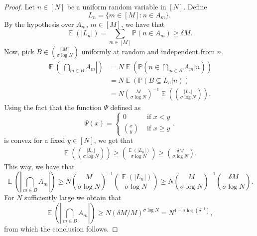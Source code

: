 \documentclass[letter, 11pt]{article}
\theoremstyle{plain} %
\theoremstyle{definition} %
\theoremstyle{plain}
\theoremstyle{plain}
\newcommand{\bP}{\mathbb{P}}
\newcommand{\1}{\mathbbm{1}}
\newcommand{\E}{\operatorname{\mathbb{E}}}
\begin{document}
\begin{proof}
    Let $n\in [N]$ be a uniform random variable in $[N]$. Define 
    $$L_n=\{m\in [M] : n\in A_m\}. $$
    By the hypothesis over $A_m$, $m\in [M]$, we have that
    $$\E(|L_n|) = \sum_{m\in [M]} \bP(n\in A_m)\geq \delta M.   $$
    Now, pick $B\in \binom{[M]}{\sigma \log{N}}$ uniformly at random and independent from $n$. 
    \begin{align*}
        \E\left( \left| \bigcap_{m\in B} A_m \right| \right) &= N \E\left(\bP\left(  n\in \bigcap_{m\in B} A_m \Bigg| n\right) \right)\\
        &= N \E\left(\bP\left( B\subseteq L_n  \Bigg| n\right) \right)\\
        &= N \binom{M}{\sigma \log{N}}^{-1} \E\left(  \binom{|L_n|}{\sigma \log{N}} \right) .
    \end{align*}
    Using the fact that the function $\Psi$ defined as
    $$
    \Psi(x) =\begin{cases}
        0 & \text{ if } x<y\\
        \binom{x}{y} & \text{ if }x\geq y
    \end{cases} .
    $$
    is convex for a fixed $y\in [N]$, we get that 
    \begin{align*}
         \E\left(  \binom{|L_n|}{\sigma \log{N}} \right)  \geq    \binom{\E\left(|L_n|\right)}{\sigma \log{N}} \geq \binom{ \delta M}{\sigma \log{N}}. 
    \end{align*}
    This way, we have that 
    $$ \E\left( \left| \bigcap_{m\in B} A_m \right| \right)\geq N \binom{M}{\sigma \log{N}}^{-1} \binom{\E\left(|L_n|\right)}{\sigma \log{N}} \geq N \binom{M}{\sigma \log{N}}^{-1}\binom{ \delta M}{\sigma \log{N}}.$$
    For $N$ sufficiently large we obtain that 
    $$\E\left( \left| \bigcap_{m\in B} A_m \right| \right)\geq   N (\delta M/M)^{\sigma \log{N}}=  N^{1-\sigma \log(\delta^{-1})}, $$
    from which the conclusion follows. 
\end{proof}
\end{document}
